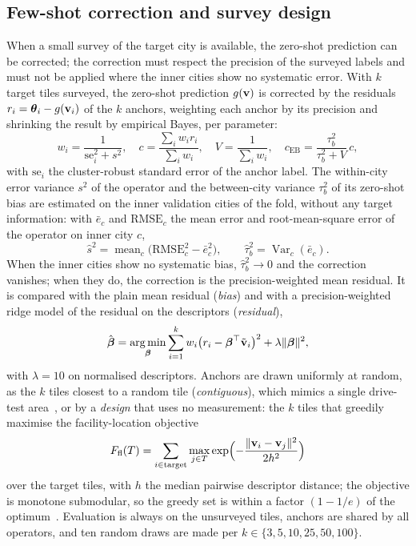 \subsection{Few-shot correction and survey design}
\label{sec:fewshot}

When a small survey of the target city is available, the zero-shot
prediction can be corrected; the correction must respect the precision of
the surveyed labels and must not be applied where the inner cities show no
systematic error. With $k$ target tiles surveyed, the zero-shot prediction
$g(\mathbf{v})$ is corrected by the residuals $r_i=\boldsymbol{\theta}_i-g(\mathbf{v}_i)$ of the $k$
anchors, weighting each anchor by its precision and shrinking the result by
empirical Bayes, per parameter:
\begin{equation}
w_i=\frac{1}{\mathrm{se}_i^{2}+s^{2}},\quad
c=\frac{\sum_i w_i r_i}{\sum_i w_i},\quad
V=\frac{1}{\sum_i w_i},\quad
c_{\mathrm{EB}}=\frac{\tau_b^{2}}{\tau_b^{2}+V}\,c,
\label{eq:fewshot}
\end{equation}
with $\mathrm{se}_i$ the cluster-robust standard error of the anchor label.
The within-city error variance $s^{2}$ of the operator and the between-city
variance $\tau_b^{2}$ of its zero-shot bias are estimated on the inner
validation cities of the fold, without any target information: with
$\bar e_c$ and $\mathrm{RMSE}_c$ the mean error and root-mean-square error
of the operator on inner city $c$,
\begin{equation}
\hat s^{2}=\operatorname{mean}_c\bigl(\mathrm{RMSE}_c^{2}-\bar e_c^{2}\bigr),\qquad
\hat\tau_b^{2}=\operatorname{Var}_c(\bar e_c).
\label{eq:ebprior}
\end{equation}
When the inner cities show no systematic bias, $\hat\tau_b^{2}\to0$ and the
correction vanishes; when they do, the correction is the precision-weighted
mean residual. It is compared with the plain mean residual (\emph{bias}) and
with a precision-weighted ridge model of the residual on the descriptors
(\emph{residual}),
\begin{equation}
\hat{\boldsymbol\beta}=\operatorname*{arg\,min}_{\boldsymbol\beta}\sum_{i=1}^{k}w_i\bigl(r_i-\boldsymbol\beta^{\top}\tilde{\mathbf{v}}_i\bigr)^{2}+\lambda\lVert\boldsymbol\beta\rVert^{2},
\label{eq:resid}
\end{equation}
with $\lambda=10$ on normalised descriptors. Anchors are drawn uniformly at
random, as the $k$ tiles closest to a random tile (\emph{contiguous}), which
mimics a single drive-test area~\cite{johansson2012mdt}, or by a
\emph{design} that uses no measurement: the $k$ tiles that greedily maximise
the facility-location objective
\begin{equation}
F_{\mathrm{fl}}(T)=\sum_{i\in\text{target}}\max_{j\in T}\exp\Bigl(-\frac{\lVert\mathbf{v}_i-\mathbf{v}_j\rVert^{2}}{2h^{2}}\Bigr)
\label{eq:facility}
\end{equation}
over the target tiles, with $h$ the median pairwise descriptor distance;
the objective is monotone submodular, so the greedy set is within a factor
$(1-1/e)$ of the optimum~\cite{nemhauser1978,krause2008}. Evaluation is
always on the unsurveyed tiles, anchors are shared by all operators, and
ten random draws are made per $k\in\{3,5,10,25,50,100\}$.

